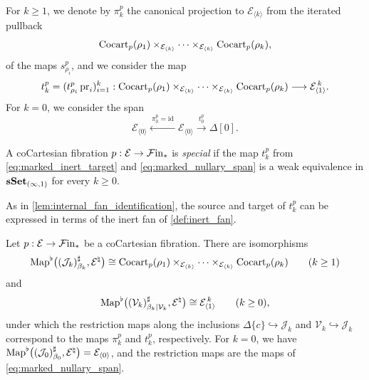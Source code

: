 \documentclass[10pt,reqno]{amsart}
\begin{document}
For $k\geq1$, we denote by $\pi_k^p$ the canonical projection to
$\mathcal E_{\langle k\rangle}$ from the iterated pullback
\[
\operatorname{Cocart}_p(\rho_1)
\times_{\mathcal E_{\langle k\rangle}}\cdots
\times_{\mathcal E_{\langle k\rangle}}\operatorname{Cocart}_p(\rho_k),
\]
of the maps $s_{\rho_i}^p$, and we consider the map
\begin{equation}
\label{eq:marked_inert_target}
t_k^p=(t_{\rho_i}^p\operatorname{pr}_i)_{i=1}^k:
\operatorname{Cocart}_p(\rho_1)
\times_{\mathcal E_{\langle k\rangle}}\cdots
\times_{\mathcal E_{\langle k\rangle}}\operatorname{Cocart}_p(\rho_k)
\longrightarrow\mathcal E_{\langle1\rangle}^{\,k}.
\end{equation}
For $k=0$, we consider the span
\begin{equation}
\label{eq:marked_nullary_span}
\mathcal E_{\langle0\rangle}
\xleftarrow{\ \pi_0^p=\mathrm{id}\ }
\mathcal E_{\langle0\rangle}
\xrightarrow{\ t_0^p\ }\Delta[0].
\end{equation}

\begin{definition}
\label{def:special_cocartesian_fibration}
A coCartesian fibration $p:\mathcal E\to\mathcal{F}\mathrm{in}_*$ is
\emph{special} if the map $t_k^p$ from
\eqref{eq:marked_inert_target} and \eqref{eq:marked_nullary_span} is a
weak equivalence in $\mathbf{sSet}_{(\infty,1)}$ for every $k\geq0$.
\end{definition}

As in \cref{lem:internal_fan_identification}, the source and target of
$t_k^p$ can be expressed in terms of the inert fan of
\cref{def:inert_fan}.

\begin{lemma}
\label{lem:inert_fan_mapping_objects}
Let $p:\mathcal E\to\mathcal{F}\mathrm{in}_*$ be a coCartesian fibration. There are
isomorphisms
\[
\operatorname{Map}^\flat\bigl((\mathcal J_k)^\sharp_{\beta_k},
\mathcal E^\natural\bigr)
\cong
\operatorname{Cocart}_p(\rho_1)
\times_{\mathcal E_{\langle k\rangle}}\cdots
\times_{\mathcal E_{\langle k\rangle}}\operatorname{Cocart}_p(\rho_k)
\qquad(k\geq1)
\]
and
\[
\operatorname{Map}^\flat\bigl((\mathcal V_k)^\sharp_{\beta_k|\mathcal V_k},
\mathcal E^\natural\bigr)
\cong\mathcal E_{\langle1\rangle}^{\,k}
\qquad(k\geq0),
\]
under which the restriction maps along the inclusions
$\Delta\{c\}\hookrightarrow\mathcal J_k$ and
$\mathcal V_k\hookrightarrow\mathcal J_k$ correspond to the maps
$\pi_k^p$ and $t_k^p$, respectively. For $k=0$, we have
$\operatorname{Map}^\flat\bigl((\mathcal J_0)^\sharp_{\beta_0},
\mathcal E^\natural\bigr)=\mathcal E_{\langle0\rangle}$, and the
restriction maps are the maps of \eqref{eq:marked_nullary_span}.
\end{lemma}
\end{document}
